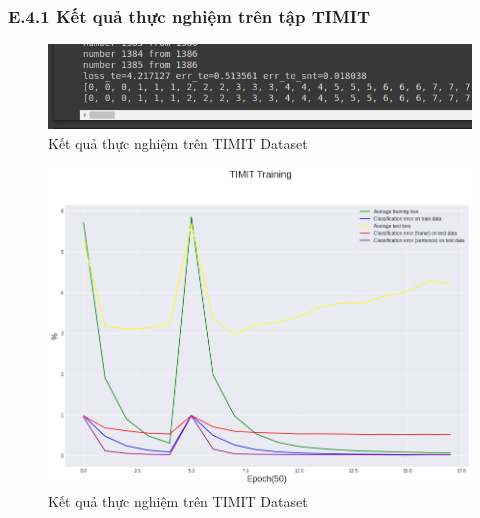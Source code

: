 \documentclass{article}
\begin{document}
	\subsubsection{E.4.1 Kết quả thực nghiệm trên tập TIMIT}
	\begin{figure}[H]
		\centering
		\includegraphics[width=.75\textwidth]{result/evaluate_result_timit.png}
		\caption{Kết quả thực nghiệm trên TIMIT Dataset}
		\label{fig:writing-thesis}
	\end{figure}
	\begin{figure}[H]
		\centering
		\includegraphics[width=.75\textwidth]{result/sincnet_timit_plot.png}
		\caption{Kết quả thực nghiệm trên TIMIT Dataset}
		\label{fig:writing-thesis}
	\end{figure}
\end{document}
